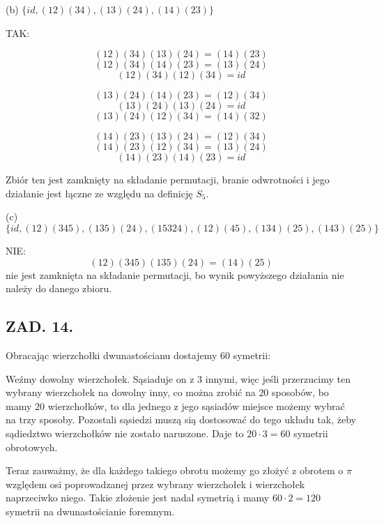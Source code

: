 \documentclass{article}[13pt]
\begin{document}
{\color{acc}(b)} $\{id, (12)(34), (13)(24), (14)(23)\}$
\smallskip

TAK:

$$(12)(34)(13)(24)=(14)(23)$$
$$(12)(34)(14)(23)=(13)(24)$$
$$(12)(34)(12)(34)=id$$

$$(13)(24)(14)(23)=(12)(34)$$
$$(13)(24)(13)(24)=id$$
$$(13)(24)(12)(34)=(14)(32)$$

$$(14)(23)(13)(24)=(12)(34)$$
$$(14)(23)(12)(34)=(13)(24)$$
$$(14)(23)(14)(23)=id$$

Zbiór ten jest zamknięty na składanie permutacji, branie odwrotności i jego działanie jest łączne ze względu na definicję $S_5$.
\medskip

{\color{acc}(c)} $\{id, (12)(345), (135)(24), (15324), (12)(45), (134)(25), (143)(25)\}$
\smallskip

NIE:
$$(12)(345)(135)(24)=(14)(25)$$
nie jest zamknięta na składanie permutacji, bo wynik powyższego działania nie należy do danego zbioru.

\subsection*{ZAD. 14.}

Obracając wierzchołki dwunastościanu dostajemy $60$ symetrii:
\smallskip

Weźmy dowolny wierzchołek. Sąsiaduje on z $3$ innymi, więc jeśli przerzucimy ten wybrany wierzchołek na dowolny inny, co można zrobić na $20$ sposobów, bo mamy $20$ wierzchołków, to dla jednego z jego sąsiadów miejsce możemy wybrać na trzy sposoby. Pozostali sąsiedzi muszą sią dostosować do tego układu tak, żeby sądiedztwo wierzchołków nie zostało naruszone. Daje to $20\cdot 3=60$ symetrii obrotowych.
\medskip

Teraz zauważmy, że dla każdego takiego obrotu możemy go złożyć z obrotem o $\pi$ względem osi poprowadzanej przez wybrany wierzchołek i wierzchołek naprzeciwko niego. Takie złożenie jest nadal symetrią i mamy $60\cdot 2=120$ symetrii na dwunastościanie foremnym.
\end{document}
